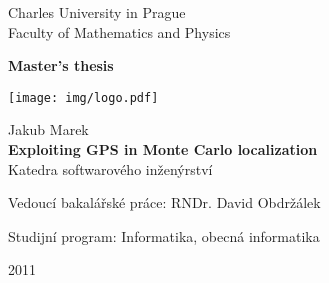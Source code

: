 \begin{titlepage}
\begin{center}


\vspace{15mm}

\large
Charles University in Prague\\
Faculty of Mathematics and Physics\\

\vspace{5mm}

{\Large\bf Master's thesis}

\vspace{10mm}

\texttt{[image: img/logo.pdf]} 

\vspace{15mm}

{\Large Jakub Marek}\\
\vspace{5mm}
{\Large\bf Exploiting GPS in Monte Carlo localization}\\
\vspace{5mm}
Katedra softwarového inženýrství\\
\vspace{15mm}

\large
\noindent Vedoucí bakalářské práce: RNDr. David Obdržálek
\vspace{1mm} 

\noindent Studijní program: Informatika, obecná informatika 

\vspace{20mm}

2011
\end{center}

\end{titlepage}

\normalsize
